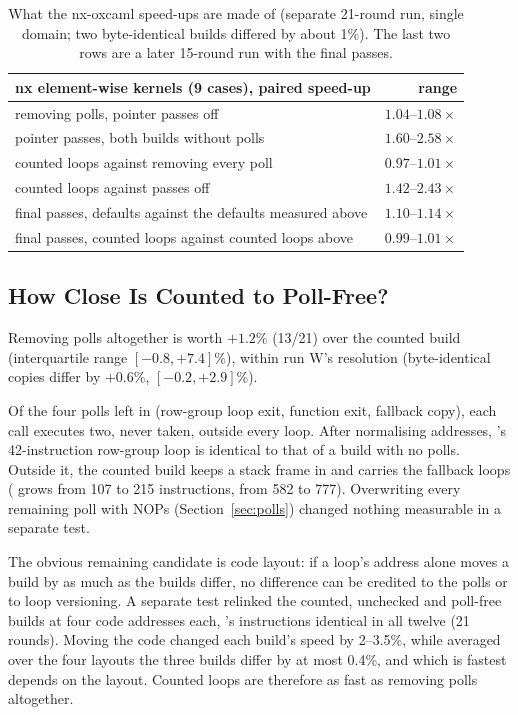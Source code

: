 \begin{table}[h]
  \centering
  \small
  \begin{tabular}{@{}lr@{}}
    \toprule
    nx element-wise kernels (9 cases), paired speed-up & range \\
    \midrule
    removing polls, pointer passes off & $1.04$--$1.08\times$ \\
    pointer passes, both builds without polls & $1.60$--$2.58\times$ \\
    counted loops against removing every poll & $0.97$--$1.01\times$ \\
    counted loops against passes off & $1.42$--$2.43\times$ \\
    \midrule
    final passes, defaults against the defaults measured above & $1.10$--$1.14\times$ \\
    final passes, counted loops against counted loops above & $0.99$--$1.01\times$ \\
    \bottomrule
  \end{tabular}
  \caption{What the nx-oxcaml speed-ups are made of (separate 21-round run,
  single domain; two byte-identical builds differed by about 1\%). The last two
  rows are a later 15-round run with the final passes.}
  \label{tab:nxablation}
\end{table}

\subsection{How Close Is Counted to Poll-Free?}
\label{sec:last2}
Removing polls altogether is worth $+1.2\%$ (13/21) over the counted
build (interquartile range $[-0.8, +7.4]\%$), within run W's
resolution (byte-identical copies differ by $+0.6\%$,
$[-0.2, +2.9]\%$).

Of the four polls left in  (row-group loop exit, function exit,
fallback copy), each call executes two, never taken, outside every loop.
After normalising addresses, 's 42-instruction row-group loop is
identical to that of a build with no polls. Outside it, the counted build
keeps a stack frame in  and carries the fallback loops
( grows from 107 to 215 instructions,  from 582 to
777). Overwriting every remaining poll with NOPs (Section~\ref{sec:polls})
changed nothing measurable in a separate test.

The obvious remaining candidate is code layout: if a loop's address alone
moves a build by as much as the builds differ, no difference can be credited
to the polls or to loop versioning. A separate test relinked the counted,
unchecked and poll-free builds at four code addresses each, 's
instructions identical in all twelve (21 rounds). Moving the code changed each
build's speed by 2--3.5\%, while averaged over the four layouts the three
builds differ by at most 0.4\%, and which is fastest depends on the layout.
Counted loops are therefore as fast as removing polls altogether.

